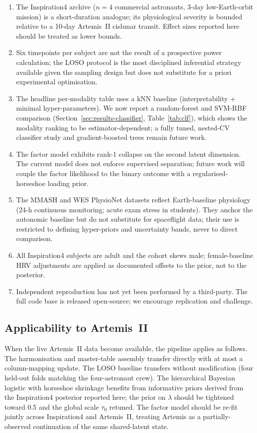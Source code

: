 \documentclass[11pt,a4paper,3p,authoryear]{elsarticle}
\begin{document}
\begin{enumerate}
\item The Inspiration4 archive ($n=4$ commercial astronauts, 3-day low-Earth-orbit mission) is a short-duration analogue; its physiological severity is bounded relative to a 10-day Artemis~II cislunar transit. Effect sizes reported here should be treated as lower bounds.
\item Six timepoints per subject are not the result of a prospective power calculation; the LOSO protocol is the most disciplined inferential strategy available given the sampling design but does not substitute for a priori experimental optimisation.
\item The headline per-modality table uses a kNN baseline (interpretability + minimal hyper-parameters). We now report a random-forest and SVM-RBF comparison (Section~\ref{sec:results-classifier}, Table~\ref{tab:clf}), which shows the modality ranking to be estimator-dependent; a fully tuned, nested-CV classifier study and gradient-boosted trees remain future work.
\item The factor model exhibits rank-1 collapse on the second latent dimension. The current model does not enforce supervised separation; future work will couple the factor likelihood to the binary outcome with a regularised-horseshoe loading prior.
\item The MMASH and WES PhysioNet datasets reflect Earth-baseline physiology (24-h continuous monitoring; acute exam stress in students). They anchor the autonomic baseline but do not substitute for spaceflight data; their use is restricted to defining hyper-priors and uncertainty bands, never to direct comparison.
\item All Inspiration4 subjects are adult and the cohort skews male; female-baseline HRV adjustments \citep{Voss2015gender} are applied as documented offsets to the prior, not to the posterior.
\item Independent reproduction has not yet been performed by a third-party. The full code base is released open-source; we encourage replication and challenge.
\end{enumerate}

\subsection{Applicability to Artemis~II}

When the live Artemis~II data become available, the pipeline applies as follows. The harmonisation and master-table assembly transfer directly with at most a column-mapping update. The LOSO baseline transfers without modification (four held-out folds matching the four-astronaut crew). The hierarchical Bayesian logistic with horseshoe shrinkage benefits from informative priors derived from the Inspiration4 posterior reported here; the prior on $\lambda$ should be tightened toward 0.5 and the global scale $\tau_0$ retuned. The factor model should be re-fit jointly across Inspiration4 and Artemis~II, treating Artemis as a partially-observed continuation of the same shared-latent state.
\end{document}
